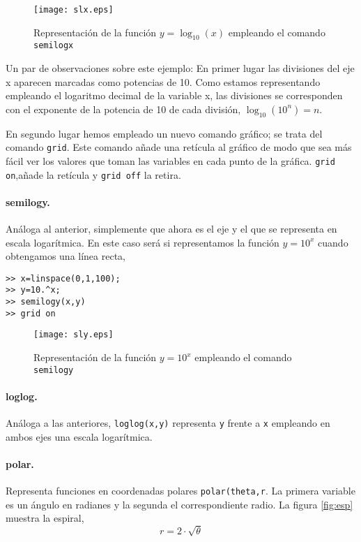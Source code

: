 \begin{figure}[h]
\centering
\texttt{[image: slx.eps]}
\caption{Representación de la función $y=\log_{10}(x)$ empleando el comando \texttt{semilogx}}
\label{fig:slx}
\end{figure} 

Un par de observaciones sobre este ejemplo: En primer lugar las divisiones del eje x aparecen marcadas como potencias de 10. Como estamos representando empleando el logaritmo decimal de la variable x, las divisiones se corresponden con el exponente de la potencia de 10 de cada división, $\log_{10}(10^n)=n$.

En segundo lugar hemos empleado un nuevo comando gráfico; se trata del comando \texttt{grid}. Este comando añade una retícula al gráfico de modo que sea más fácil ver los valores que toman las variables en cada punto de la gráfica. \texttt{grid on},añade la retícula y \texttt{grid off} la retira.

\paragraph{semilogy.} Análoga al anterior, simplemente que ahora es el eje y el que se representa en escala logarítmica. En este caso será si representamos la función $y=10^x$ cuando obtengamos una línea recta,

\begin{verbatim}
>> x=linspace(0,1,100);
>> y=10.^x;
>> semilogy(x,y)
>> grid on
\end{verbatim}

\begin{figure}[h]
\centering
\texttt{[image: sly.eps]}
\caption{Representación de la función $y=10^x$ empleando el comando \texttt{semilogy}}
\label{fig:sly}
\end{figure}

\paragraph{loglog.} Análoga a las anteriores, \texttt{loglog(x,y)} representa \texttt{y} frente a \texttt{x} empleando en ambos ejes una escala logarítmica.


\paragraph{polar.} Representa funciones en coordenadas polares \texttt{polar(theta,r}. La primera variable es un ángulo en radianes y la segunda el correspondiente radio. La figura \ref{fig:esp} muestra la espiral,
\begin{equation*}
r=2\cdot\sqrt{\theta}
\end{equation*}

